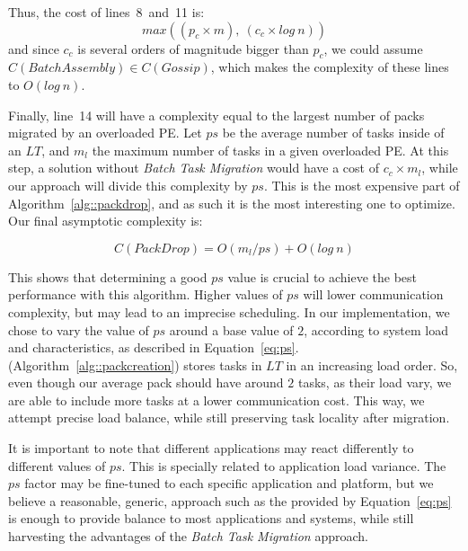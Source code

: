 Thus, the cost of lines~8~and~11 is:
\begin{equation}
 max((p_c\times m),\ (c_c\times log\ n))
\end{equation}
and since $c_c$ is several orders of magnitude bigger than $p_c$, we could assume $C(BatchAssembly) \in C(Gossip)$, which makes the 
complexity of these lines to $O(log\ n)$.

Finally, line~14 will have a complexity equal to the largest number of packs migrated by an overloaded PE.
Let $ps$ be the average number of tasks inside of an $LT$, and $m_l$ the maximum number of tasks in a given overloaded PE.
At this step, a solution without \textit{Batch Task Migration} would have a cost of $c_c\times m_l$, while our approach will divide this complexity by $ps$. 
This is the most expensive part of Algorithm~\ref{alg::packdrop}, and as such it is the most interesting one to optimize.
Our final asymptotic complexity is:

\begin{equation}
 C(PackDrop) = O(m_l/ps) + O(log\ n)
 \label{eq:worstcase}
\end{equation}

This shows that determining a good $ps$ value is crucial to achieve the best performance with this algorithm.
Higher values of $ps$ will lower communication complexity, but may lead to an imprecise scheduling.
In our implementation, we chose to vary the value of $ps$ around a base value of $2$, according to system load and characteristics, as described in Equation~\ref{eq:ps}.
\batchassembly (Algorithm~\ref{alg::packcreation}) stores tasks in $LT$ in an increasing load order.
So, even though our average pack should have around $2$ tasks, as their load vary, we are able to include more tasks at a lower communication cost.
This way, we attempt precise load balance, while still preserving task locality after migration.

It is important to note that different applications may react differently to different values of $ps$.
This is specially related to application load variance.
The $ps$ factor may be fine-tuned to each specific application and platform, but we believe a reasonable, generic, approach such as the provided by Equation~\ref{eq:ps} is enough to provide balance to most applications and systems, while still harvesting the advantages of the \textit{Batch Task Migration} approach.
